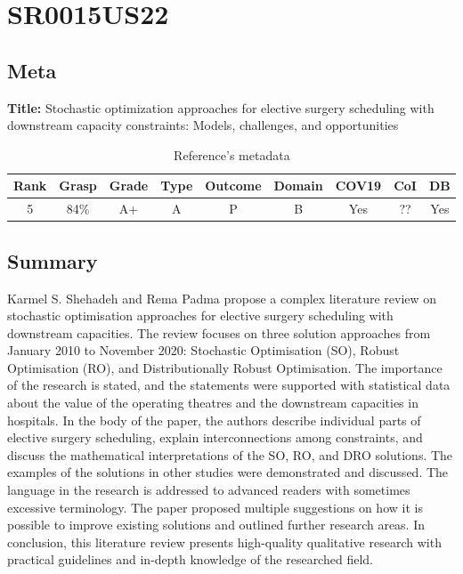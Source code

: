 \section{ SR0015US22 }


\subsection{Meta}

    \textbf{Title:}
    Stochastic optimization approaches for elective surgery scheduling with downstream capacity constraints: Models, challenges, and opportunities

    \begin{table}[H]
        \centering
        \begin{tabular}{|c|c|c|c|c|c|c|c|c|}
            \hline
                \textbf{Rank} & \textbf{Grasp} & \textbf{Grade} & \textbf{Type} & \textbf{Outcome} & \textbf{Domain} & \textbf{COV19} & \textbf{CoI} & \textbf{DB} \\
            \hline
                5 & 84\% & A+ & A & P & B & Yes & ?? & Yes \\
            \hline
        \end{tabular}
        \caption{Reference's metadata}
        \label{tab:SR02CN23}
    \end{table}

\subsection{Summary}
    Karmel S. Shehadeh and Rema Padma \cite{x335} propose a complex literature review on stochastic optimisation approaches for elective surgery scheduling with downstream capacities. The review focuses on three solution approaches from January 2010 to November 2020: Stochastic Optimisation (SO), Robust Optimisation (RO), and Distributionally Robust Optimisation. The importance of the research is stated, and the statements were supported with statistical data about the value of the operating theatres and the downstream capacities in hospitals. In the body of the paper, the authors describe individual parts of elective surgery scheduling, explain interconnections among constraints, and discuss the mathematical interpretations of the SO, RO, and DRO solutions. The examples of the solutions in other studies were demonstrated and discussed. The language in the research is addressed to advanced readers with sometimes excessive terminology. The paper proposed multiple suggestions on how it is possible to improve existing solutions and outlined further research areas. In conclusion, this literature review presents high-quality qualitative research with practical guidelines and in-depth knowledge of the researched field.   

